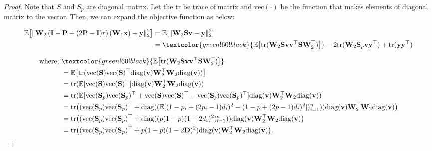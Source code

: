 \begin{proof}
    Note that $S$ and $S_p$ are diagonal matrix. Let the $\text{tr}$ be trace of matrix and $\text{vec}(\cdot)$ be the function that makes elements of diagonal matrix to the vector. Then, we can expand the objective function as below:
    
    \begin{align}
        \mathbb{E}\big[\|\mathbf{W}_2 \left(\mathbf{I} - \mathbf{P} + (2\mathbf{P} - \mathbf{I})r\right)(\mathbf{W}_1\mathbf{x}) - \mathbf{y}\|_2^2 \big] 
        &= \mathbb E[\|\mathbf{W}_2 \mathbf{S}\mathbf{v} - \mathbf{y}\|_2^2] \label{eq:AID_objective}\\
        &= \textcolor{green!60!black}{\mathbb{E}\big[ \text{tr}(\mathbf{W}_2 \mathbf{S} \mathbf{v} \mathbf{v}^\top \mathbf{S} \mathbf{W}_2^\top) \big]}  - 2\text{tr}(\mathbf{W}_2 \mathbf{S}_p \mathbf{v} \mathbf{y}^\top) + \text{tr}(\mathbf{y} \mathbf{y}^\top) \nonumber
    \end{align}

    
    \begin{align*}
        \text{where, }&\textcolor{green!60!black}{\mathbb{E}\big[\text{tr}(\mathbf{W}_2 \mathbf{S} \mathbf{v} \mathbf{v}^\top \mathbf{S} \mathbf{W}_2^\top) \big]} \\
        &= \mathbb{E}\big[\text{tr}(\text{vec}(\mathbf{S})\text{vec}(\mathbf{S})^\top \text{diag}(\mathbf{v}) \mathbf{W}_2^\top \mathbf{W}_2 \text{diag}(\mathbf{v}))\big] \\
        &= \text{tr}(\mathbb{E}[\text{vec}(\mathbf{S})\text{vec}(\mathbf{S})^\top] \text{diag}(\mathbf{v}) \mathbf{W}_2^\top \mathbf{W}_2 \text{diag}(\mathbf{v})) \\
        &= \text{tr}(\mathbb{E}[\text{vec}(\mathbf{S}_p)\text{vec}(\mathbf{S}_p)^\top + \text{vec}(\mathbf{S})\text{vec}(\mathbf{S})^\top - \text{vec}(\mathbf{S}_p)\text{vec}(\mathbf{S}_p)^\top] \text{diag}(\mathbf{v}) \mathbf{W}_2^\top \mathbf{W}_2 \text{diag}(\mathbf{v})) \\
        &= \text{tr}\big((\text{vec}(\mathbf{S}_p)\text{vec}(\mathbf{S}_p)^\top + \text{diag}((\mathbb{E}[(1-p_i + (2p_i-1)d_i)^2 - (1-p + (2p-1)d_i)^2])_{i=1}^n)) \text{diag}(\mathbf{v}) \mathbf{W}_2^\top \mathbf{W}_2 \text{diag}(\mathbf{v})\big) \\
        &= \text{tr}\big((\text{vec}(\mathbf{S}_p)\text{vec}(\mathbf{S}_p)^\top + \text{diag}((p(1-p)(1-2d_i)^2)_{i=1}^n)) \text{diag}(\mathbf{v}) \mathbf{W}_2^\top \mathbf{W}_2 \text{diag}(\mathbf{v})\big) \\
        &= \text{tr}\big((\text{vec}(\mathbf{S}_p)\text{vec}(\mathbf{S}_p)^\top + p(1-p)(1-2\mathbf{D})^2) \text{diag}(\mathbf{v}) \mathbf{W}_2^\top \mathbf{W}_2 \text{diag}(\mathbf{v})\big).
    \end{align*}
    


\end{proof}
